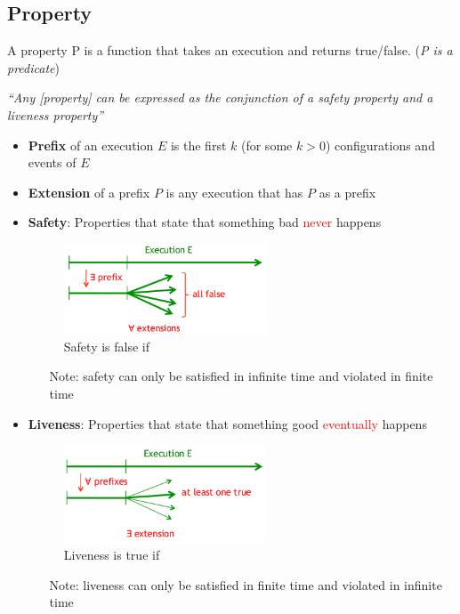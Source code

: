 \subsection{Property}

A property P is a function that takes an execution and returns
true/false. (\textit{P is a predicate})

\begin{center}
    \textit{“Any [property] can be expressed as the
conjunction of a safety property and a
liveness property”}
\end{center}

\begin{itemize}
    \item \textbf{Prefix} of an execution $E$ is the first $k$ (for
        some $k>0$) configurations and events of $E$
    \item \textbf{Extension} of a prefix $P$ is any execution
        that has $P$ as a prefix

    \item \textbf{Safety}: Properties that state that something bad \textcolor{red}{never}
        happens

        \begin{figure}[!ht]
            \centering
            \includegraphics[width=6cm]{img/safety.png}
            \caption{Safety is false if}
        \end{figure}
        \FloatBarrier{}

        \begin{itemize}
            \item[Note:] safety can only be satisfied in infinite time and violated in
                finite time
        \end{itemize}

    \item \textbf{Liveness}: Properties that state that something good
        \textcolor{red}{eventually} happens


        \begin{figure}[!ht]
            \centering
            \includegraphics[width=6cm]{img/liveness.png}
            \caption{Liveness is true if}
        \end{figure}
        \FloatBarrier{}


        \begin{itemize}
            \item[Note:] liveness can only be satisfied in finite time and violated in
                infinite time
        \end{itemize}
\end{itemize}



